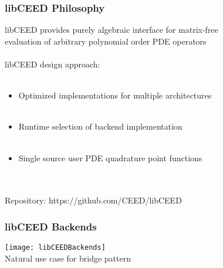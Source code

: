 \documentclass{beamer}
\begin{document}
\begin{frame}
\begin{center}
\frametitle{libCEED Philosophy}

libCEED provides purely algebraic interface for matrix-free\\
evaluation of arbitrary polynomial order PDE operators\\

~\\

libCEED design approach:\\

~\\

\begin{itemize}

\item Optimized implementations for multiple architectures\\

~\\

\item Runtime selection of backend implementation\\

~\\

\item Single source user PDE quadrature point functions

\end{itemize}\\

~\\

Repository: https://github.com/CEED/libCEED

\end{center}
\end{frame}


\begin{frame}
\begin{center}
\frametitle{libCEED Backends}

\texttt{[image: libCEEDBackends]}\\

Natural use case for bridge pattern\\

\end{center}
\end{frame}

\end{document}
